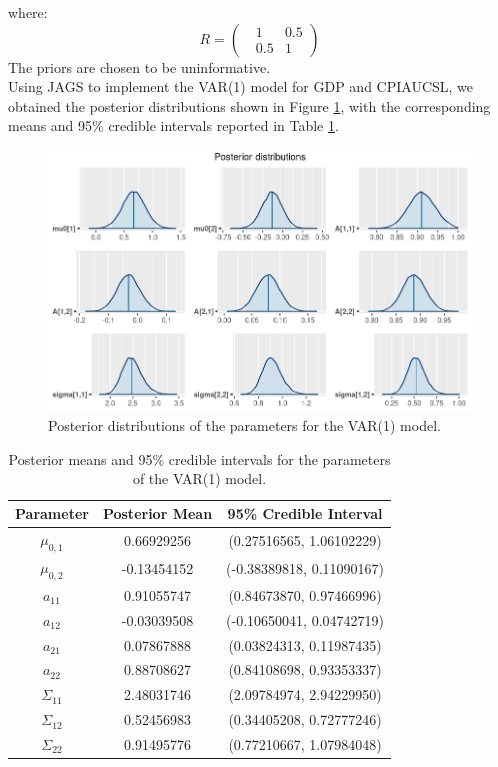 where: 
\begin{equation}
    R = 
    \begin{pmatrix}
        \ \ \ 1 & 0.5 \\
        \ \ \ 0.5 & 1
    \end{pmatrix}
\end{equation}
The priors are chosen to be uninformative. \\
Using JAGS to implement the VAR(1) model for GDP and CPIAUCSL, we obtained the posterior distributions shown in Figure \ref{fig:VAR1_posteriors}, with the corresponding means and 95\% credible intervals reported in Table \ref{tab:VAR1_posteriors}. \\
\begin{figure}[H]
    \centering
    \includegraphics[width=\textwidth]{images/6-VAR/posteriors.png}
    \caption{Posterior distributions of the parameters for the VAR(1) model.}
    \label{fig:VAR1_posteriors}
\end{figure}
\begin{table}[H]
    \centering
    \begin{tabular}{|c|c|c|}
        \hline
        \textbf{Parameter } & \textbf{Posterior Mean } & \textbf{95\% Credible Interval } \\
        \hline
        $\mu_{0,1}$     &  0.66929256 &  (0.27516565, 1.06102229) \\
        $\mu_{0,2}$     & -0.13454152 &  (-0.38389818, 0.11090167) \\
        $a_{11}$     &  0.91055747 &  (0.84673870, 0.97466996) \\
        $a_{12}$     & -0.03039508 &  (-0.10650041, 0.04742719) \\
        $a_{21}$     &  0.07867888 &  (0.03824313, 0.11987435) \\
        $a_{22}$     &  0.88708627 &  (0.84108698, 0.93353337) \\
        $\Sigma_{11}$ &  2.48031746 &  (2.09784974, 2.94229950) \\
        $\Sigma_{12}$ &  0.52456983 &  (0.34405208, 0.72777246) \\
        $\Sigma_{22}$ &  0.91495776 &  (0.77210667, 1.07984048) \\
        \hline
    \end{tabular}
    \caption{Posterior means and 95\% credible intervals for the parameters of the VAR(1) model.}
    \label{tab:VAR1_posteriors}
\end{table}

